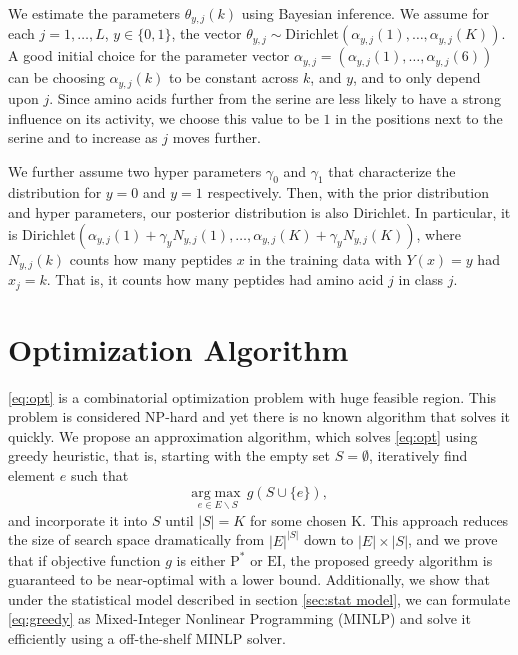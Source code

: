 \documentclass[opre,nonblindrev]{informs3} %
\newcommand{\EI}{\mathrm{EI}}
\newcommand{\Dir}{\mathrm{Dirichlet}}
\newcommand{\PI}{\text{P}^*}
\begin{document}
We estimate the parameters $\theta_{y,j}(k)$ using Bayesian inference. We assume for each $j=1,\ldots,L$, $y\in\{0,1\}$, the vector $\theta_{y,j}\sim\Dir(\alpha_{y,j}(1),\ldots,\alpha_{y,j}(K))$. A good initial choice for the parameter vector $\alpha_{y,j} = (\alpha_{y,j}(1),\ldots,\alpha_{y,j}(6))$ can be choosing $\alpha_{y,j}(k)$ to be constant across $k$, and $y$, and to only depend upon $j$. Since amino acids further from the serine are less likely to have a strong influence on its activity, we choose this value to be $1$ in the positions next to the serine and to increase as $j$ moves further.

We further assume two hyper parameters $\gamma_0$ and $\gamma_1$ that characterize the distribution for $y=0$ and $y=1$ respectively. Then, with the prior distribution and hyper parameters, our posterior distribution is also Dirichlet. In particular, it is 
$\Dir( \alpha_{y,j}(1) + \gamma_yN_{y,j}(1), \ldots, \alpha_{y,j}(K) + \gamma_yN_{y,j}(K))$,
where $N_{y,j}(k)$ counts how many peptides $x$ in the training data with $Y(x)=y$ had $x_j=k$.  That is, it counts how many peptides had amino acid $j$ in class $j$.

\section{Optimization Algorithm}
\eqref{eq:opt} is a combinatorial optimization problem with huge feasible region. This problem is considered NP-hard and yet there is no known algorithm that solves it quickly. We propose an approximation algorithm, which solves \eqref{eq:opt} using greedy heuristic, that is, starting with the empty set $S=\emptyset$, iteratively find element $e$ such that 
\begin{equation} \label{eq:greedy}
  \underset{e \in E \backslash S}{\mathrm{arg}\max} \,g(S \cup \{e\}),
\end{equation}
and incorporate it into $S$ until $|S|=K$ for some chosen K. This approach reduces the size of search space dramatically from $|E|^{|S|}$ down to $|E| \times |S|$, and we prove that if objective function $g$ is either $\PI$ or $\EI$, the proposed greedy algorithm is guaranteed to be near-optimal with a lower bound. Additionally, we show that under the statistical model described in section \ref{sec:stat model}, we can formulate \eqref{eq:greedy} as Mixed-Integer Nonlinear Programming
(MINLP) and solve it efficiently using a off-the-shelf MINLP solver.
\end{document}
